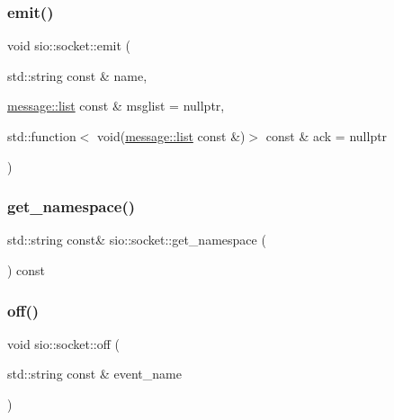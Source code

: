 \subsubsection{\texorpdfstring{emit()}{emit()}}
{\footnotesize\ttfamily void sio\+::socket\+::emit (\begin{DoxyParamCaption}\item[{std\+::string const \&}]{name,  }\item[{\hyperlink{classsio_1_1message_1_1list}{message\+::list} const \&}]{msglist = {\ttfamily nullptr},  }\item[{std\+::function$<$ void(\hyperlink{classsio_1_1message_1_1list}{message\+::list} const \&)$>$ const \&}]{ack = {\ttfamily nullptr} }\end{DoxyParamCaption})}

\mbox{\label{classsio_1_1socket_ae0c48ebc168d677baaaefe45217f1185}} 
\subsubsection{\texorpdfstring{get\+\_\+namespace()}{get\_namespace()}}
{\footnotesize\ttfamily std\+::string const\& sio\+::socket\+::get\+\_\+namespace (\begin{DoxyParamCaption}{ }\end{DoxyParamCaption}) const}

\mbox{\label{classsio_1_1socket_a7be26cf14d0611636c486a11a2b2ac02}} 
\subsubsection{\texorpdfstring{off()}{off()}}
{\footnotesize\ttfamily void sio\+::socket\+::off (\begin{DoxyParamCaption}\item[{std\+::string const \&}]{event\+\_\+name }\end{DoxyParamCaption})}

\mbox{\label{classsio_1_1socket_a34e500f6baec2a9619887aa97cd7b794}} 
